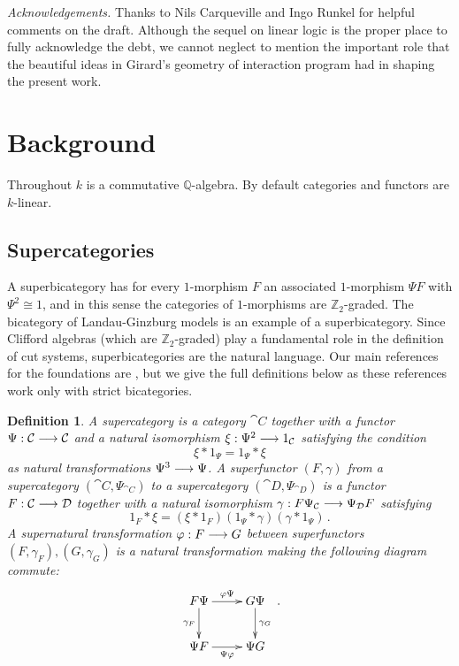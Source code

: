\documentclass[english,letter paper,12pt,leqno]{article}
\theoremstyle{example}
\newtheorem{definition}[theorem]{Definition}
\numberwithin{equation}{section}
\begin{document}
\medskip

\emph{Acknowledgements.} Thanks to Nils Carqueville and Ingo Runkel for helpful comments on the draft. Although the sequel on linear logic is the proper place to fully acknowledge the debt, we cannot neglect to mention the important role that the beautiful ideas in Girard's geometry of interaction program \cite{girard_towards} had in shaping the present work.

\section{Background}\label{section:background}

Throughout $k$ is a commutative $\mathbb{Q}$-algebra. By default categories and functors are $k$-linear.

\subsection{Supercategories}

A superbicategory has for every $1$-morphism $F$ an associated $1$-morphism $\Psi F$ with $\Psi^2 \cong 1$, and in this sense the categories of $1$-morphisms are $\mathbb{Z}_2$-graded. The bicategory of Landau-Ginzburg models is an example of a superbicategory. Since Clifford algebras (which are $\mathbb{Z}_2$-graded) play a fundamental role in the definition of cut systems, superbicategories are the natural language. Our main references for the foundations are \cite{ellis_lauda,kang,kang2}, but we give the full definitions below as these references work only with strict bicategories.

\begin{definition} A \emph{supercategory} is a category $\cat{C}$ together with a functor $\Psi: \mathcal{C} \longrightarrow \mathcal{C}$ and a natural isomorphism $\xi: \Psi^2 \longrightarrow 1_{\mathcal{C}}$ satisfying the condition
\[
\xi * 1_{\Psi} = 1_{\Psi} * \xi
\]
as natural transformations $\Psi^3 \longrightarrow \Psi$. A \emph{superfunctor} $(F, \gamma)$ from a supercategory $(\cat{C}, \Psi_{\cat{C}})$ to a supercategory $(\cat{D}, \Psi_{\cat{D}})$ is a functor $F: \mathcal{C} \longrightarrow \mathcal{D}$ together with a natural isomorphism $\gamma: F \Psi_{\mathcal{C}} \longrightarrow \Psi_{\mathcal{D}} F$ satisfying
\[
1_F * \xi = (\xi * 1_F ) ( 1_{\Psi} * \gamma ) ( \gamma * 1_{\Psi} )\,.
\]
A \emph{supernatural transformation} $\varphi: F \longrightarrow G$ between superfunctors $(F,\gamma_F), (G,\gamma_G)$ is a natural transformation making the following diagram commute:
\[
\xymatrix{
F \Psi \ar[r]^-{\varphi \Psi}\ar[d]_-{\gamma_F} & G \Psi \ar[d]^-{\gamma_G}\\
\Psi F \ar[r]_-{\Psi \varphi} & \Psi G
}\,.
\] 
\end{definition}
\end{document}
